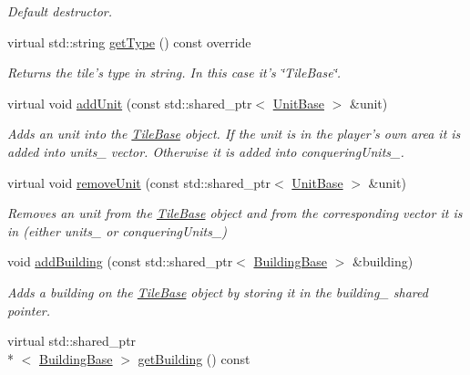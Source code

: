 \begin{DoxyCompactItemize}
\begin{DoxyCompactList}\small\item\em Default destructor. \end{DoxyCompactList}\item 
virtual std\-::string \hyperlink{class_course_1_1_tile_base_af1a8aaa3407ad3ade7ffe8f2fb421288}{get\-Type} () const override
\begin{DoxyCompactList}\small\item\em Returns the tile's type in string. In this case it's \char`\"{}\-Tile\-Base\char`\"{}. \end{DoxyCompactList}\item 
virtual void \hyperlink{class_course_1_1_tile_base_a652b310be1d952f4fb103836143fb4af}{add\-Unit} (const std\-::shared\-\_\-ptr$<$ \hyperlink{class_course_1_1_unit_base}{Unit\-Base} $>$ \&unit)
\begin{DoxyCompactList}\small\item\em Adds an unit into the \hyperlink{class_course_1_1_tile_base}{Tile\-Base} object. If the unit is in the player's own area it is added into units\-\_\- vector. Otherwise it is added into conquering\-Units\-\_\-. \end{DoxyCompactList}\item 
virtual void \hyperlink{class_course_1_1_tile_base_a1692e8dc8309f5ee3b88924313e22053}{remove\-Unit} (const std\-::shared\-\_\-ptr$<$ \hyperlink{class_course_1_1_unit_base}{Unit\-Base} $>$ \&unit)
\begin{DoxyCompactList}\small\item\em Removes an unit from the \hyperlink{class_course_1_1_tile_base}{Tile\-Base} object and from the corresponding vector it is in (either units\-\_\- or conquering\-Units\-\_\-) \end{DoxyCompactList}\item 
void \hyperlink{class_course_1_1_tile_base_add69a1e9ec009dedb28ce54c8535370b}{add\-Building} (const std\-::shared\-\_\-ptr$<$ \hyperlink{class_course_1_1_building_base}{Building\-Base} $>$ \&building)
\begin{DoxyCompactList}\small\item\em Adds a building on the \hyperlink{class_course_1_1_tile_base}{Tile\-Base} object by storing it in the building\-\_\- shared pointer. \end{DoxyCompactList}\item 
virtual std\-::shared\-\_\-ptr\\*
$<$ \hyperlink{class_course_1_1_building_base}{Building\-Base} $>$ \hyperlink{class_course_1_1_tile_base_ab6174bf534d4307c22945c08b621c02b}{get\-Building} () const 

\end{DoxyCompactItemize}
